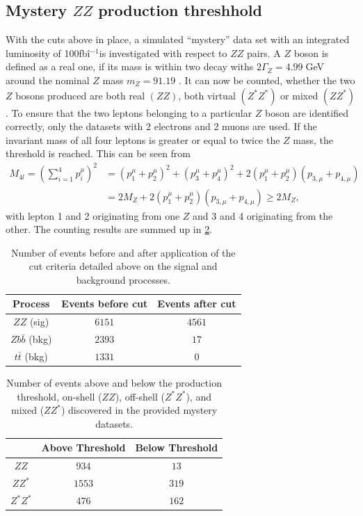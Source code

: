 \documentclass[twoside,        %
               BCOR12mm,       %
               ngerman,english, %
               fleqn,headsepline=false,footsepline=false
              ]{Vorlage/MFPREPORT}
\begin{document}
\subsection{Mystery $ZZ$ production threshhold}
With the cuts above in place, a simulated ``mystery'' data set with an
integrated luminosity of 100\;fbî$^{-1}$is investigated with respect to $ZZ$
pairs. A $Z$ boson is defined as a real one, if its mass is within two decay
withs $2\Gamma_Z=4.99\;$GeV around the nominal $Z$ mass $m_Z=91.19$
\cite{pdataz}. It can now be counted, whether the two $Z$ bosons produced are
both real $(ZZ)$, both virtual $(Z^*Z^*)$ or mixed $(ZZ^{*})$. To ensure that
the two leptons belonging to a particular $Z$ boson are identified correctly,
only the datasets with 2 electrons and 2 muons are used.
If the invariant mass of all four leptons is greater or equal to twice the $Z$
mass, the threshold is reached. This can be seen from
\begin{align}
    \label{eq:threshhold}
    M_{4l}=(\sum_{i=1}^4p_i^\mu)^2&=(p_1^\mu+p_2^\mu)^2+(p_3^\mu+p_4^\mu)^2+2(p_1^{\mu}+p_2^{\mu})(p_{3,\mu}+p_{4,\mu})\\
    &=2M_Z+2(p_1^{\mu}+p_2^{\mu})(p_{3,\mu}+p_{4,\mu})\geq2M_Z,
\end{align}
with lepton 1 and 2 originating from one $Z$ and 3 and 4 originating from the
other. The counting results are summed up in \cref{tab:ZZcount}.







\begin{table}
\centering
\begin{tabular}{|c|c|c|}
\hline
Process& Events before cut& Events after cut\\
\hline
$ZZ$ (sig)&$6151$&$4561$\\
\hline
$Zb\bar b$ (bkg)& $2393$&$17$\\
\hline
$t\bar t$ (bkg)&$1331$&$0$\\
\hline
\end{tabular}
\caption{Number of events before and after
application of the cut criteria detailed
above on the signal and background
processes.}
\label{tab:cutresults}
\end{table}
\begin{table}
\centering
\begin{tabular}{|c|c|c|}
\hline
& Above Threshold& Below
Threshold\\
\hline
$ZZ$&$934$&$13$\\
\hline
$ZZ^*$& $1553$&$319$\\
\hline
$Z^*Z^*$&$476$&$162$\\
\hline
\end{tabular}
\caption{Number
of events
above and
below the
production
threshold,
on-shell
($ZZ$),
off-shell
($Z^*Z^*$),
and mixed
($ZZ^*$)
discovered in
the provided
mystery
datasets.}
\label{tab:ZZcount}
\end{table}
\end{document}
